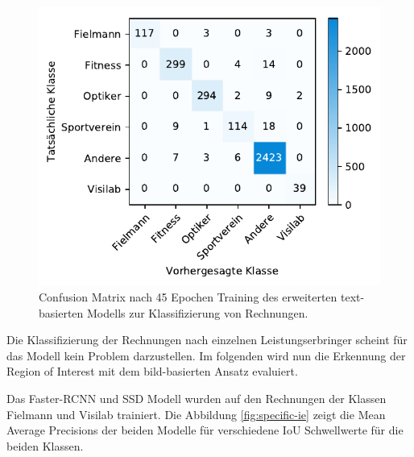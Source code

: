 \begin{figure}[h!] 
    \captionsetup{width=.9\linewidth}
    \caption[Confusion Matrix des um die Klassen Fielmann und Visilab ergänzten text-basierten Modells zur Klassifizierung von Rechnungen]{Confusion Matrix nach 45 Epochen Training des erweiterten text-basierten Modells zur Klassifizierung von Rechnungen.}
    \label{fielmann-cm}
    \centering
    \includegraphics[scale=1]{graphics/matplot/class__fielmann__cm_44.pdf}
\end{figure}

Die Klassifizierung der Rechnungen nach einzelnen Leistungserbringer scheint für das Modell kein Problem darzustellen. Im folgenden wird nun die Erkennung der Region of Interest mit dem bild-basierten Ansatz evaluiert.

Das Faster-RCNN und SSD Modell wurden auf den Rechnungen der Klassen Fielmann und Visilab trainiert. Die Abbildung \ref{fig:specific-ie} zeigt die Mean Average Precisions der beiden Modelle für verschiedene IoU Schwellwerte für die beiden Klassen.

